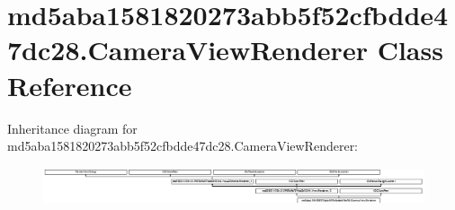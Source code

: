 \hypertarget{classmd5aba1581820273abb5f52cfbdde47dc28_1_1CameraViewRenderer}{}\section{md5aba1581820273abb5f52cfbdde47dc28.\+Camera\+View\+Renderer Class Reference}
\label{classmd5aba1581820273abb5f52cfbdde47dc28_1_1CameraViewRenderer}
Inheritance diagram for md5aba1581820273abb5f52cfbdde47dc28.\+Camera\+View\+Renderer\+:\begin{figure}[H]
\begin{center}
\leavevmode
\includegraphics[height=1.098039cm]{classmd5aba1581820273abb5f52cfbdde47dc28_1_1CameraViewRenderer}
\end{center}
\end{figure}
